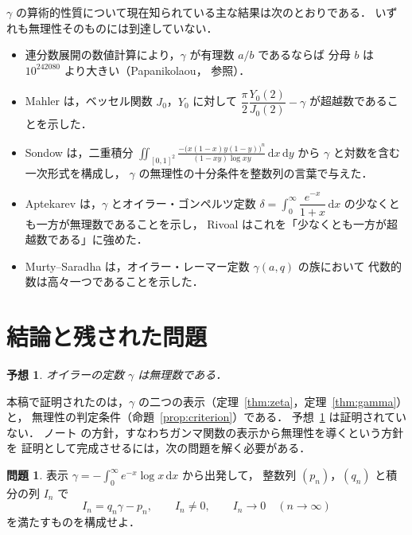 \documentclass[a4paper,11pt]{ltjsarticle}
\theoremstyle{plain}
\newtheorem{conjecture}[theorem]{予想}
\theoremstyle{definition}
\newtheorem{problem}[theorem]{問題}
\newcommand{\dd}{\,\mathrm{d}}
\begin{document}
$\gamma$ の算術的性質について現在知られている主な結果は次のとおりである．
いずれも無理性そのものには到達していない．

\begin{itemize}
  \item 連分数展開の数値計算により，$\gamma$ が有理数 $a/b$ であるならば
        分母 $b$ は $10^{242080}$ より大きい（Papanikolaou，\cite{Lagarias} 参照）．
  \item Mahler \cite{Mahler} は，ベッセル関数 $J_0$，$Y_0$ に対して
        $\dfrac{\pi}{2}\dfrac{Y_0(2)}{J_0(2)}-\gamma$ が超越数であることを示した．
  \item Sondow \cite{Sondow} は，二重積分
        $\displaystyle\iint_{[0,1]^2}\frac{-\bigl(x(1-x)y(1-y)\bigr)^{n}}{(1-xy)\log xy}\dd x\dd y$
        から $\gamma$ と対数を含む一次形式を構成し，
        $\gamma$ の無理性の十分条件を整数列の言葉で与えた．
  \item Aptekarev \cite{Aptekarev} は，$\gamma$ とオイラー・ゴンペルツ定数
        $\delta=\int_0^\infty\dfrac{e^{-x}}{1+x}\dd x$ の少なくとも一方が無理数であることを示し，
        Rivoal \cite{Rivoal} はこれを「少なくとも一方が超越数である」に強めた．
  \item Murty--Saradha \cite{MurtySaradha} は，オイラー・レーマー定数 $\gamma(a,q)$ の族において
        代数的数は高々一つであることを示した．
\end{itemize}

\section{結論と残された問題}

\begin{conjecture}\label{conj:irr}
オイラーの定数 $\gamma$ は無理数である．
\end{conjecture}

本稿で証明されたのは，$\gamma$ の二つの表示（定理~\ref{thm:zeta}，定理~\ref{thm:gamma}）と，
無理性の判定条件（命題~\ref{prop:criterion}）である．
予想~\ref{conj:irr} は証明されていない．
ノート \cite{Note} の方針，すなわちガンマ関数の表示から無理性を導くという方針を
証明として完成させるには，次の問題を解く必要がある．

\begin{problem}\label{prob:main}
表示 $\gamma=-\int_0^\infty e^{-x}\log x\dd x$ から出発して，
整数列 $(p_n)$，$(q_n)$ と積分の列 $I_n$ で
\[
  I_n=q_n\gamma-p_n,\qquad I_n\ne0,\qquad I_n\to0\quad(n\to\infty)
\]
を満たすものを構成せよ．
\end{problem}
\end{document}
